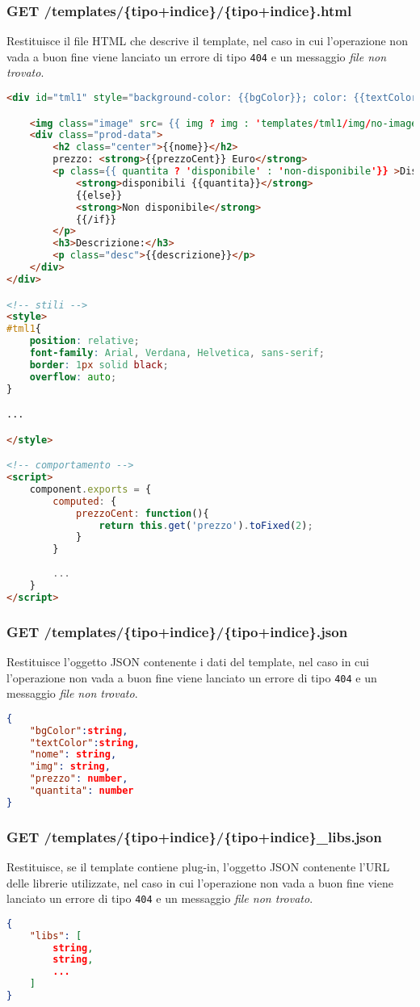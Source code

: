 \newpage
\subsubsection{GET /templates/\{tipo+indice\}/\{tipo+indice\}.html}
Restituisce il file HTML che descrive il template, nel caso in cui l'operazione non vada a buon fine viene lanciato un errore di tipo \texttt{404} e un messaggio \textit{file non trovato}.
\begin{lstlisting}[language=HTML, caption=Esempio di template mustache restituito.]
<div id="tml1" style="background-color: {{bgColor}}; color: {{textColor}};">

	<img class="image" src= {{ img ? img : 'templates/tml1/img/no-image.png'}}>
	<div class="prod-data">
		<h2 class="center">{{nome}}</h2>
		prezzo: <strong>{{prezzoCent}} Euro</strong>
		<p class={{ quantita ? 'disponibile' : 'non-disponibile'}} >Disponibilità: {{#if quantita}}
			<strong>disponibili {{quantita}}</strong>
			{{else}}
			<strong>Non disponibile</strong>
			{{/if}}
		</p>
		<h3>Descrizione:</h3>
		<p class="desc">{{descrizione}}</p>
	</div>
</div>

<!-- stili -->
<style>
#tml1{
	position: relative;
	font-family: Arial, Verdana, Helvetica, sans-serif;
	border: 1px solid black;
	overflow: auto;
}

...

</style>

<!-- comportamento -->
<script>
	component.exports = {
		computed: {
			prezzoCent: function(){
				return this.get('prezzo').toFixed(2);
			}
		}
		
		...
	}
</script>
\end{lstlisting}

\newpage
\subsubsection{GET /templates/\{tipo+indice\}/\{tipo+indice\}.json}
Restituisce l'oggetto JSON contenente i dati del template, nel caso in cui l'operazione non vada a buon fine viene lanciato un errore di tipo \texttt{404} e un messaggio \textit{file non trovato}.

\begin{lstlisting}[language=JSON, caption=Esempio di oggetto JSON restituito.]
{
	"bgColor":string,
	"textColor":string,
	"nome": string,
	"img": string,
	"prezzo": number,
	"quantita": number
}
\end{lstlisting}
\subsubsection{GET /templates/\{tipo+indice\}/\{tipo+indice\}\_libs.json}
Restituisce, se il template contiene plug-in, l'oggetto JSON contenente l'URL delle librerie utilizzate, nel caso in cui l'operazione non vada a buon fine viene lanciato un errore di tipo \texttt{404} e un messaggio \textit{file non trovato}.
\begin{lstlisting}[language=JSON, caption=Esempio di oggetto JSON restituito.]
{
	"libs": [
		string,
		string,
		...
	]
}
\end{lstlisting}

